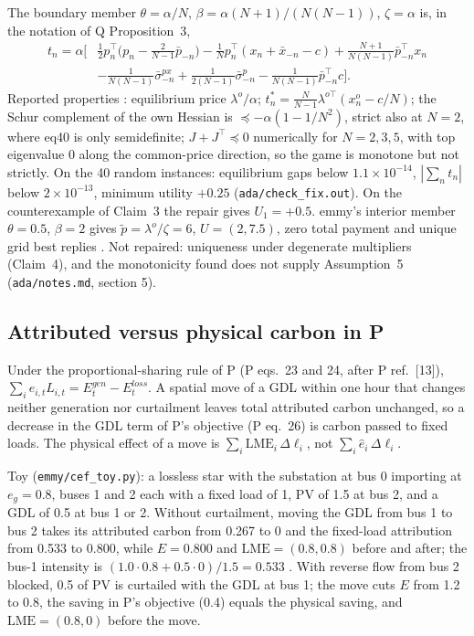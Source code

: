 \documentclass{article}
\begin{document}
The boundary member \(\theta=\alpha/N\), \(\beta=\alpha(N+1)/(N(N-1))\), \(\zeta=\alpha\)  is, in the notation of Q Proposition~3,
\begin{align*}
t_n=\alpha\Big[&\tfrac12p_n^\top\big(p_n-\tfrac{2}{N-1}\bar p_{-n}\big)-\tfrac1Np_n^\top(x_n+\bar x_{-n}-c)+\tfrac{N+1}{N(N-1)}\bar p_{-n}^\top x_n\\
&-\tfrac{1}{N(N-1)}\bar\sigma^{px}_{-n}+\tfrac{1}{2(N-1)}\bar\sigma^{p}_{-n}-\tfrac{1}{N(N-1)}\bar p_{-n}^\top c\Big].
\end{align*}
Reported properties : equilibrium price \(\lambda^o/\alpha\); \(t^*_n=\frac{N}{N-1}\lambda^{o\top}(x^o_n-c/N)\); the Schur complement of the own Hessian is \(\preceq-\alpha(1-1/N^2)\), strict also at \(N=2\), where eq40 is only semidefinite; \(J+J^\top\preceq0\) numerically for \(N=2,3,5\), with top eigenvalue 0 along the common-price direction, so the game is monotone but not strictly. On the 40 random instances: equilibrium gaps below \(1.1\times10^{-14}\), \(|\sum_nt_n|\) below \(2\times10^{-13}\), minimum utility \(+0.25\) (\texttt{ada/check\_fix.out}). On the counterexample of Claim~3 the repair gives \(U_1=+0.5\). emmy's interior member \(\theta=0.5\), \(\beta=2\) gives \(\tilde p=\lambda^o/\zeta=6\), \(U=(2,7.5)\), zero total payment and unique grid best replies . Not repaired: uniqueness under degenerate multipliers (Claim~4), and the monotonicity found does not supply Assumption~5 (\texttt{ada/notes.md}, section 5).

\subsection{Attributed versus physical carbon in P}

\begin{claim}
Under the proportional-sharing rule of P (P eqs.~23 and 24, after P ref.~[13]), \(\sum_ie_{i,t}L_{i,t}=E^{gen}_t-E^{loss}_t\). A spatial move of a GDL within one hour that changes neither generation nor curtailment leaves total attributed carbon unchanged, so a decrease in the GDL term of P's objective (P eq.~26) is carbon passed to fixed loads. The physical effect of a move is \(\sum_i\mathrm{LME}_i\,\Delta\ell_i\), not \(\sum_i\hat e_i\,\Delta\ell_i\). 
\end{claim}

Toy (\texttt{emmy/cef\_toy.py}): a lossless star with the substation at bus 0 importing at \(e_g=0.8\), buses 1 and 2 each with a fixed load of 1, PV of 1.5 at bus 2, and a GDL of 0.5 at bus 1 or 2. Without curtailment, moving the GDL from bus 1 to bus 2 takes its attributed carbon from 0.267 to 0 and the fixed-load attribution from 0.533 to 0.800, while \(E=0.800\) and \(\mathrm{LME}=(0.8,0.8)\) before and after; the bus-1 intensity is \((1.0\cdot0.8+0.5\cdot0)/1.5=0.533\) . With reverse flow from bus 2 blocked, 0.5 of PV is curtailed with the GDL at bus 1; the move cuts \(E\) from 1.2 to 0.8, the saving in P's objective (0.4) equals the physical saving, and \(\mathrm{LME}=(0.8,0)\) before the move.
\end{document}
